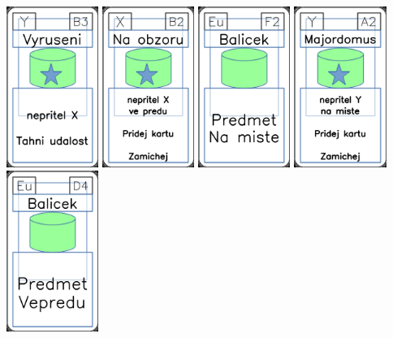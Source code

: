 \documentclass[a4paper]{article}
\begin{document}
	\includegraphics[width=3.0cm]{img-5_37}
	\includegraphics[width=3.0cm]{img-5_6}
	\includegraphics[width=3.0cm]{img-4_26}
	\includegraphics[width=3.0cm]{img-5_31}
	\includegraphics[width=3.0cm]{img-4_18}
\end{document}
